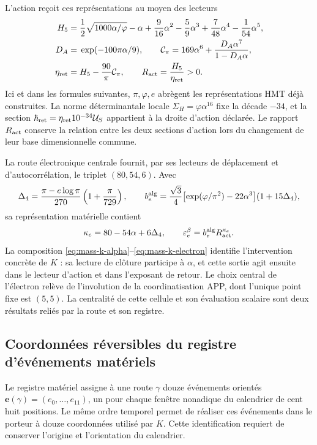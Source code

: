 L'action reçoit ces représentations au moyen des lecteurs
\begin{align}
 H_5={}&\frac12\sqrt{1000\alpha/\varphi}-\alpha+
       \frac9{16}\alpha^2-\frac59\alpha^3+
       \frac7{48}\alpha^4-\frac1{54}\alpha^5,\notag\\
 D_A={}&\exp(-100\pi\alpha/9),\qquad
 \mathcal C_\pi=169\alpha^6+\frac{D_A\alpha^7}{1-D_A\alpha},\notag\\
 \eta_{\rm ret}={}&H_5-\frac{90}{\pi}\mathcal C_\pi,
 \qquad R_{\rm act}=\frac{H_5}{\eta_{\rm ret}}>0.
 \label{eq:mass-k-action}
\end{align}
Ici et dans les formules suivantes, \(\pi,\varphi,e\) abrègent les représentations HMT déjà construites. La norme déterminantale locale \(\Sigma_H=\varphi\alpha^{16}\) fixe la décade \(-34\), et la section \(\hbar_{\rm ret}=\eta_{\rm ret}10^{-34}\mathcal U_S\) appartient à la droite d'action déclarée. Le rapport \(R_{\rm act}\) conserve la relation entre les deux sections d'action lors du changement de leur base dimensionnelle commune.

La route électronique centrale fournit, par ses lecteurs de
déplacement et d’autocorrélation, le triplet \((80,54,6)\). Avec
\[
 \Delta_4=\frac{\pi-e\log\pi}{270}\left(1+\frac\pi{729}\right),
 \qquad
 b_e^{\rm alg}=\frac{\sqrt3}{4}
       \bigl[\exp(\varphi/\pi^2)-22\alpha^3\bigr](1+15\Delta_4),
\]
sa représentation matérielle contient
\begin{equation}
 \kappa_e=80-54\alpha+6\Delta_4,
 \qquad \varepsilon_e^\beta=b_e^{\rm alg}R_{\rm act}^{\kappa_e}.
 \label{eq:mass-k-electron}
\end{equation}
La composition \eqref{eq:mass-k-alpha}--\eqref{eq:mass-k-electron} identifie l'intervention concrète de \(K\) : sa lecture de clôture participe à \(\alpha\), et cette sortie agit ensuite dans le lecteur d'action et dans l'exposant de retour. Le choix central de l'électron relève de l'involution de la coordinatisation APP, dont l'unique point fixe est \((5,5)\). La centralité de cette cellule et son évaluation scalaire sont deux résultats reliés par la route et son registre.

\subsection{Coordonnées réversibles du registre d’événements matériels}

Le registre matériel assigne à une route \(\gamma\) douze événements
orientés \(\mathbf e(\gamma)=(e_0,\ldots,e_{11})\), un pour chaque
fenêtre nonadique du calendrier de cent huit positions. Le même
ordre temporel permet de réaliser ces événements dans le porteur à douze
coordonnées utilisé par \(K\). Cette identification requiert de conserver
l’origine et l’orientation du calendrier.


